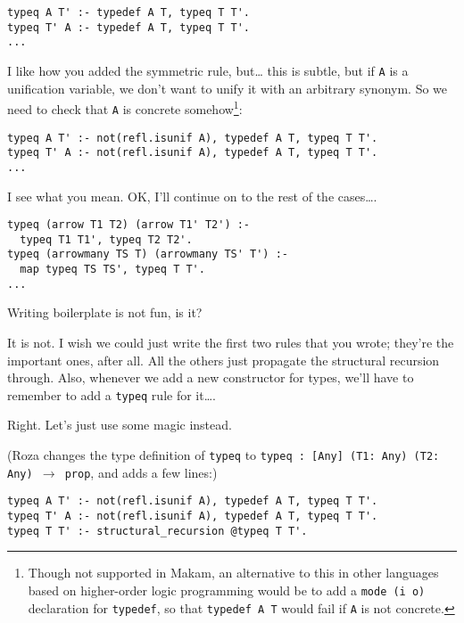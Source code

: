\begin{verbatim}
typeq A T' :- typedef A T, typeq T T'.
typeq T' A :- typedef A T, typeq T T'.
...
\end{verbatim}

\heroADVISOR{} I like how you added the symmetric rule, but\ldots{} this is
subtle, but if \texttt{A} is a unification variable, we don't want to
unify it with an arbitrary synonym. So we need to check that \texttt{A}
is concrete
somehow\footnote{Though not supported in Makam, an alternative to this in other languages based on higher-order logic programming would be to add a \texttt{mode (i o)} declaration for \texttt{typedef}, so that \texttt{typedef A T} would fail if \texttt{A} is not concrete.}:

\begin{verbatim}
typeq A T' :- not(refl.isunif A), typedef A T, typeq T T'.
typeq T' A :- not(refl.isunif A), typedef A T, typeq T T'.
...
\end{verbatim}

\heroSTUDENT{} I see what you mean. OK, I'll continue on to the rest of the
cases\ldots{}.

\begin{verbatim}
typeq (arrow T1 T2) (arrow T1' T2') :-
  typeq T1 T1', typeq T2 T2'.
typeq (arrowmany TS T) (arrowmany TS' T') :-
  map typeq TS TS', typeq T T'.
...
\end{verbatim}

\heroADVISOR{} Writing boilerplate is not fun, is it?

\heroSTUDENT{} It is not. I wish we could just write the first two rules that
you wrote; they're the important ones, after all. All the others just
propagate the structural recursion through. Also, whenever we add a new
constructor for types, we'll have to remember to add a \texttt{typeq}
rule for it\ldots{}.

\heroADVISOR{} Right. Let's just use some magic instead.

\begin{scenecomment}
(Roza changes the type definition of \texttt{typeq} to \texttt{typeq : [Any] (T1: Any) (T2: Any) \ensuremath{\to} prop},
and adds a few lines:)
\end{scenecomment}

\begin{verbatim}
typeq A T' :- not(refl.isunif A), typedef A T, typeq T T'.
typeq T' A :- not(refl.isunif A), typedef A T, typeq T T'.
typeq T T' :- structural_recursion @typeq T T'.
\end{verbatim}

